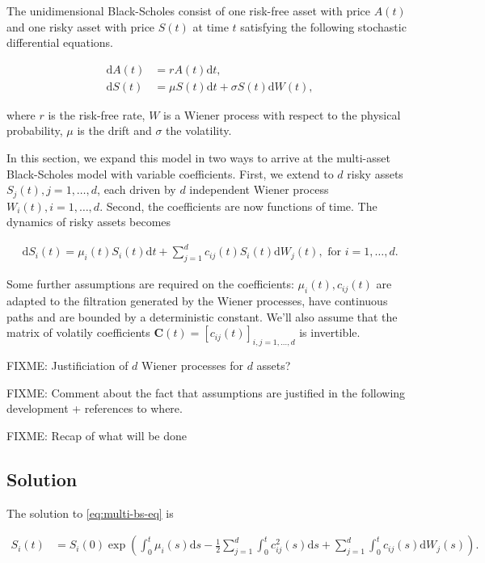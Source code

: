 \documentclass[a4paper]{article}
\begin{document}
The unidimensional Black-Scholes consist of one risk-free asset with price $A(t)$ and one risky asset with price $S(t)$ at time $t$ satisfying the following stochastic differential equations.

\begin{align*}
  \mathrm{d}A(t) &= r A(t) \mathrm{d}t,\\
  \mathrm{d}S(t) &= \mu S(t) \mathrm{d}t + \sigma S(t) \mathrm{d}W(t),
\end{align*}

where $r$ is the risk-free rate, $W$ is a Wiener process with respect to the physical probability, $\mu$ is the drift and $\sigma$ the volatility.

In this section, we expand this model in two ways to arrive at the multi-asset Black-Scholes model with variable coefficients. First, we extend to $d$ risky assets $S_j(t), j =  1, \ldots, d$, each driven by $d$ independent Wiener process $W_i(t), i = 1, \ldots, d$. Second, the coefficients are now functions of time. The dynamics of risky assets becomes

\begin{align}\label{eq:multi-bs-eq}
  \mathrm{d}S_i(t) = \mu_i(t) S_i(t) \mathrm{d}t + \sum_{j=1}^{d} c_{ij}(t) S_i(t) \mathrm{d}W_j(t), \text{ for } i = 1,\ldots,d.
\end{align}

Some further assumptions are required on the coefficients: $\mu_i(t), c_{ij}(t)$ are adapted to the filtration generated by the Wiener processes, have continuous paths and are bounded by a deterministic constant. We'll also assume that the matrix of volatily coefficients $\mathbf{C}(t) = [c_{ij}(t)]_{i,j=1,\ldots,d}$ is invertible.

FIXME: Justificiation of $d$ Wiener processes for $d$ assets?

FIXME: Comment about the fact that assumptions are justified in the following development + references to where.

FIXME: Recap of what will be done

\subsection{Solution}

The solution to \eqref{eq:multi-bs-eq} is

\begin{align*}
  S_i(t) &= S_i(0) \exp \left( \int_0^t \mu_i(s) \mathrm{d}s - \frac{1}{2} \sum_{j=1}^{d} \int_0^t c_{ij}^2(s) \mathrm{d}s + \sum_{j=1}^d \int_0^t c_{ij}(s) \mathrm{d}W_j(s) \right).
\end{align*}
\end{document}
